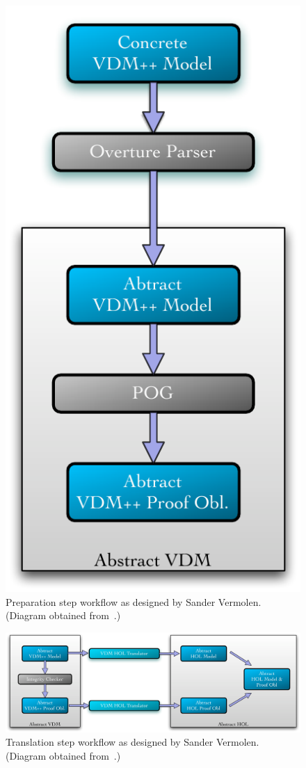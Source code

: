 \documentclass[]{article}
\begin{document}
\begin{figure}
  \begin{center}
  \includegraphics[height=.28\textheight]{images/pic_preparation.pdf}
  \caption[Preparation workflow]{Preparation step workflow as designed by Sander Vermolen. (Diagram obtained from~\cite{Vermolen07}.)}
  \label{fig:arch_preparation}
  \end{center}
\end{figure}

\begin{figure}
  \begin{center}
  \includegraphics[width=.65\textwidth]{images/pic_translation.pdf}
  \caption[Translation workflow]{Translation step workflow as designed by Sander Vermolen. (Diagram obtained from~\cite{Vermolen07}.)}
  \label{fig:arch_translation}
  \end{center}
\end{figure}
\end{document}
